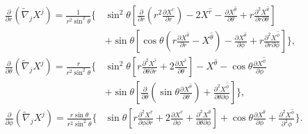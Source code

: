 \begin{align}
	\frac{\partial }{\partial r} \left( \tilde{\nabla}_j X^j \right) = \frac{1}{r^2\sin^2\theta}\Bigg\{ &
	\sin^2\theta \left[ \frac{\partial}{\partial r} \left( r^2 \frac{\partial X^{\hat{r}}}{\partial r}\right) - 2 X^{\hat{r}} - \frac{\partial X^{\hat{\theta}}}{\partial \theta} + r \frac{\partial^2 X^{\hat{\theta}}}{\partial r \partial \theta}\right] \\ \nonumber
	& + \sin\theta \left[ \cos\theta \left( r \frac{\partial X^{\hat{\theta}}}{\partial r} - X^{\hat{\theta}} \right) - \frac{\partial X^{\hat{\theta}}}{\partial \phi} + r \frac{\partial^2 X^{\hat{\phi}}}{\partial r \partial \phi}\right]
	\Bigg\}, \\
	\frac{\partial }{\partial \theta} \left( \tilde{\nabla}_j X^j \right) = \frac{r}{r^2\sin^2\theta}\Bigg\{ &
	\sin^2\theta \left[ r\frac{\partial^2 X^{\hat{r}}}{\partial \theta \partial r} + 2 \frac{\partial X^{\hat{r}}}{\partial \theta}\right] - X^{\hat{\theta}} - \cos\theta \frac{\partial X^{\hat{\phi}}}{\partial \phi}\\ \nonumber
	& + \sin\theta \left[ \frac{\partial}{\partial \theta} \left( \sin\theta \frac{\partial X^{\hat{\theta}}}{\partial \theta}\right) + \frac{\partial^2 X^{\hat{\phi}}}{\partial \theta \partial \phi}\right]
	\Bigg\}, \\
	\frac{\partial }{\partial \phi} \left( \tilde{\nabla}_j X^j \right) = \frac{r\sin\theta}{r^2\sin^2\theta}\Bigg\{ &
	\sin\theta \left[ r \frac{\partial^2 X^{\hat{r}}}{\partial \phi \partial r} + 2 \frac{\partial X^{\hat{r}}}{\partial \phi}+ \frac{\partial^2 X^{\hat{\theta}}}{\partial \theta \partial \phi}\right] + \cos\theta \frac{\partial X^{\hat{\theta}}}{\partial \phi} + \frac{\partial^2 X^{\hat{\phi}}}{\partial^2 \phi}
	\Bigg\}.
\end{align}
